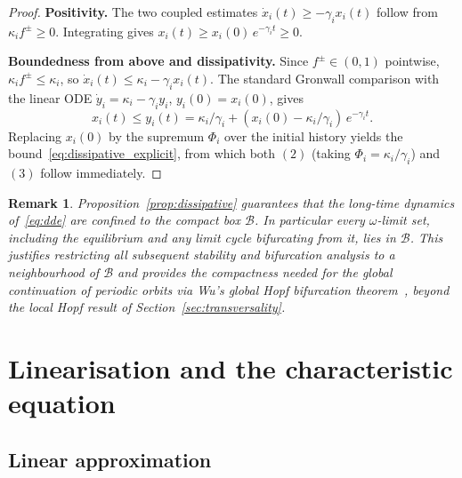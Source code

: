 \documentclass[sn-mathphys,Numbered]{sn-jnl}
\theoremstyle{thmstyleone}
\theoremstyle{thmstyletwo}
\theoremstyle{thmstylethree}
\newtheorem{remark}{Remark}
\begin{document}
\begin{proof}
\textbf{Positivity.} The two coupled estimates $\dot{x}_i(t)\geq -\gamma_i x_i(t)$
follow from $\kappa_i f^\pm\geq 0$. Integrating gives
$x_i(t)\geq x_i(0)\,e^{-\gamma_i t}\geq 0$.

\textbf{Boundedness from above and dissipativity.} Since $f^\pm\in(0,1)$
pointwise, $\kappa_i f^\pm\leq\kappa_i$, so
$\dot{x}_i(t)\leq \kappa_i - \gamma_i x_i(t)$. The standard
Gronwall comparison with the linear ODE
$\dot{y}_i = \kappa_i - \gamma_i y_i$, $y_i(0)=x_i(0)$, gives
\[
x_i(t)\leq y_i(t) = \kappa_i/\gamma_i + (x_i(0)-\kappa_i/\gamma_i)\,e^{-\gamma_i t}.
\]
Replacing $x_i(0)$ by the supremum $\Phi_i$ over the initial history
yields the bound~\eqref{eq:dissipative_explicit}, from which both $(2)$
(taking $\Phi_i=\kappa_i/\gamma_i$) and $(3)$ follow immediately.
\end{proof}

\begin{remark}
\label{rem:rough_box}
Proposition~\ref{prop:dissipative} guarantees that the long-time dynamics
of~\eqref{eq:dde} are confined to the compact box $\mathcal{B}$. In
particular every $\omega$-limit set, including the equilibrium and any
limit cycle bifurcating from it, lies in $\mathcal{B}$. This justifies
restricting all subsequent stability and bifurcation analysis to a
neighbourhood of $\mathcal{B}$ and provides the compactness needed for
the global continuation of periodic orbits via Wu's global Hopf bifurcation
theorem~\cite{wu1998symmetric}, beyond the local Hopf result of
Section~\ref{sec:transversality}.
\end{remark}

\section{Linearisation and the characteristic equation}
\label{sec:linearization}

\subsection{Linear approximation}
\end{document}
